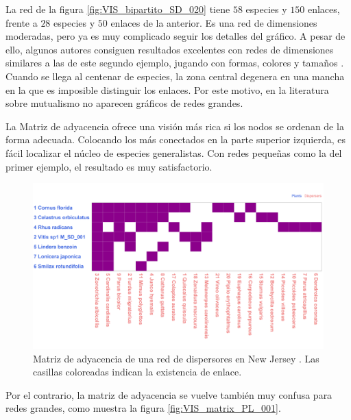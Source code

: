 La red de la figura \ref{fig:VIS_bipartito_SD_020} tiene $58$ especies y $150$ enlaces, frente a $28$ especies y $50$ enlaces de la anterior. Es una red de dimensiones moderadas, pero ya es muy complicado seguir los detalles del gráfico. A pesar de ello, algunos autores consiguen resultados excelentes con redes de dimensiones similares a las de este segundo ejemplo, jugando con formas, colores y tamaños \cite{dakos2014critical}. Cuando se llega al centenar de especies, la zona central degenera en una mancha en la que es imposible distinguir los enlaces. Por este motivo, en la literatura sobre mutualismo no aparecen gráficos de redes grandes. 

La Matriz de adyacencia ofrece una visión más rica si los nodos se ordenan de la forma adecuada. Colocando los más conectados en la parte superior izquierda, es fácil localizar el núcleo de especies generalistas. Con redes pequeñas como la del primer ejemplo, el resultado es muy satisfactorio.

\begin{figure}[h!]
\centering
\includegraphics[scale=0.4]{Figures/VIS_matrix_SD_001.png}
\caption{Matriz de adyacencia de una red de dispersores en New Jersey \cite{baird1980selection}. Las casillas coloreadas indican la existencia de enlace.}
\label{fig:VIS_matrix_SD_001}
\end{figure}

Por el contrario, la matriz de adyacencia se vuelve también muy confusa para redes grandes, como muestra la figura \ref{fig:VIS_matrix_PL_001}.

